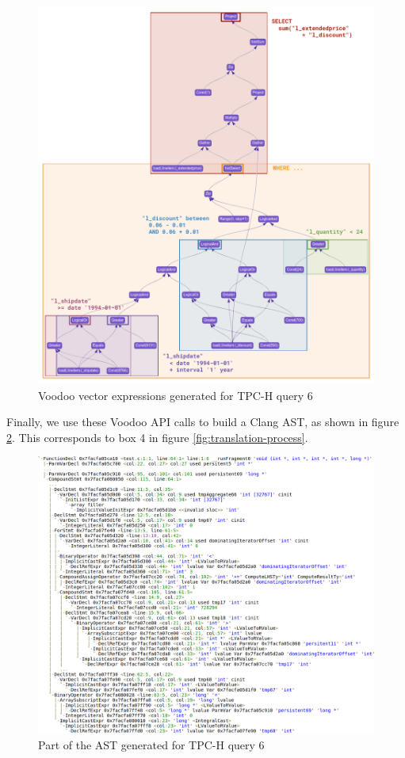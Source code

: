 \begin{figure}[H]
    \centering
    \includegraphics[width=\linewidth]{appendix/q6-voodoo.pdf}
    \caption{Voodoo vector expressions generated for TPC-H query 6}
    \label{fig:q6-voodoo}
\end{figure}

\newpage

Finally, we use these Voodoo API calls to build a Clang AST, as shown in figure \ref{fig:q6-ast}. This corresponds to box 4 in figure \ref{fig:translation-process}.

\begin{figure}[H]
    \centering
    \includegraphics[width=\linewidth]{appendix/q6-ast.png}
    \caption{Part of the AST generated for TPC-H query 6}
    \label{fig:q6-ast}
\end{figure}

